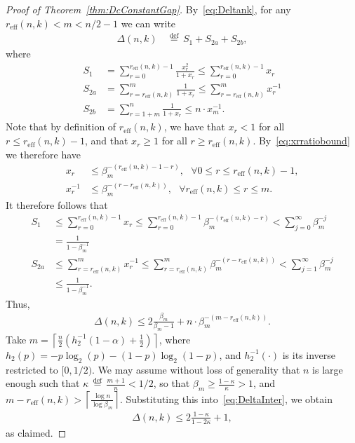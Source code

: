 \documentclass[10pt,a4paper]{amsart}
\newcommand{\df}{{\, \stackrel{\mathrm{def}}{=}\, }}
\newcommand{\reff}{{r_{\mathrm{eff}}}}
\begin{document}
\begin{proof}[Proof of Theorem~\ref{thm:DcConstantGap}]
By~\eqref{eq:Deltank}, for any $\reff(n,k)<m<n/2-1$ we can write
\begin{align}
\Delta(n,k)&\df S_1+S_{2a}+S_{2b},
\end{align}
where
\begin{align}
 S_1&=\sum_{r=0}^{\reff(n,k)-1}\frac{x_r^2}{1+x_r}\leq \sum_{r=0}^{\reff(n,k)-1} x_r\\
 S_{2a}&=\sum_{r=\reff(n,k)}^m \frac{1}{1+x_r}\leq \sum_{r=\reff(n,k)}^m x_r^{-1}\\
 S_{2b}&=\sum_{r=1+m}^n \frac{1}{1+x_r}\leq n \cdot x^{-1}_{m}.
\end{align}
Note that by definition of $\reff(n,k)$, we have that $x_r< 1$ for all $r\leq \reff(n,k)-1$, and that $x_r\geq 1$ for all $r\geq  \reff(n,k)$. By~\eqref{eq:xrratiobound} we therefore have
\begin{align}
x_r&\leq \beta_m^{-(\reff(n,k)-1-r)},~~~\forall 0\leq r\leq \reff(n,k)-1,\\
x^{-1}_r&\leq \beta_m^{-(r-\reff(n,k))},~~~\forall  \reff(n,k)\leq r\leq m.
\end{align}
It therefore follows that
\begin{align}
S_1&\leq\sum_{r=0}^{\reff(n,k)-1} x_r\leq \sum_{r=0}^{\reff(n,k)-1} \beta_m^{-(\reff(n,k)-r)}<\sum_{j=0}^\infty\beta_m^{-j}\nonumber\\
&=\frac{1}{1-\beta_m^{-1}}\\
S_{2a}&\leq\sum_{r=\reff(n,k)}^m x^{-1}_r\leq \sum_{r=\reff(n,k)}^m \beta_m^{-(r-\reff(n,k))}<\sum_{j=1}^\infty\beta_m^{-j}\nonumber\\
&\leq\frac{1}{1-\beta_m^{-1}}.
\end{align}
Thus,
\begin{align}
    \Delta(n,k)\leq 2\frac{\beta_m}{\beta_m-1}+n\cdot  \beta_m^{-(m-\reff(n,k))}.
    \label{eq:DeltaInter}
\end{align}
Take $m=\left\lceil \frac{n}{2}\left(h_2^{-1}(1-\alpha)+\frac{1}{2} \right) \right\rceil$, where $h_2(p)=-p\log_2(p)-(1-p)\log_2(1-p)$, and $h_2^{-1}(\cdot)$ is its inverse restricted to $[0,1/2)$. We may assume without loss of generality that $n$ is large enough such that $\kappa\df\frac{m+1}{n}<1/2$, so that $\beta_m\geq \frac{1-\kappa}{\kappa}>1$, and $m-\reff(n,k)>\left\lceil\frac{\log n}{\log \beta_m}\right\rceil$. Substituting this into~\eqref{eq:DeltaInter}, we obtain
\begin{align}
\Delta(n,k)\leq 2\frac{1-\kappa}{1-2\kappa}+1,    
\end{align}
as claimed.
\end{proof}
\end{document}
